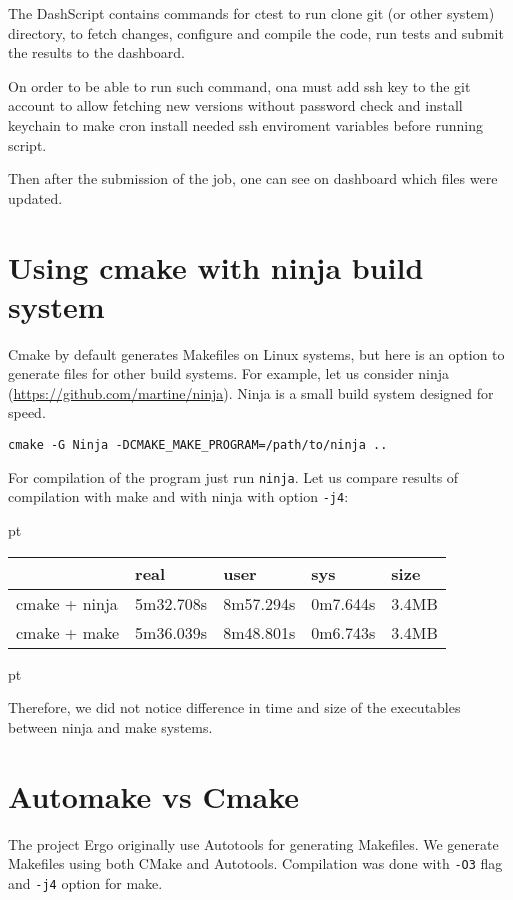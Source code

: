 \documentclass[a4paper,10pt]{article}
\begin{document}
The DashScript contains commands for ctest to run clone git (or other system) directory, to fetch changes, configure and compile the code, run tests and submit the results to the dashboard.

On order to be able to run such command, ona must add ssh key to the git account to allow fetching new versions without password check and install keychain to make cron install needed ssh enviroment variables before running script.


Then after the submission of the job, one can see on dashboard which files were updated.

\section{Using cmake with ninja build system }

Cmake by default generates Makefiles on Linux systems, but here is an option to generate files for other build systems. For example, let us consider ninja (\url{https://github.com/martine/ninja}). Ninja is a small build system designed for speed.

\begin{verbatim}
cmake -G Ninja -DCMAKE_MAKE_PROGRAM=/path/to/ninja ..
\end{verbatim}

For compilation of the program just run \texttt{ninja}.
Let us compare results of compilation with make and with ninja with option \texttt{-j4}:

 pt

\begin{tabular}{|l|l|l|l|l|}
	\hline
	& real & user & sys & size\\
	\hline
	cmake + ninja & 5m32.708s & 8m57.294s & 0m7.644s & 3.4MB\\
	cmake + make  & 5m36.039s & 8m48.801s & 0m6.743s & 3.4MB\\
	\hline
\end{tabular}

 pt

Therefore, we did not notice difference in time and size of the executables between ninja and make systems.



\section{Automake vs Cmake}

The project Ergo originally use Autotools for generating Makefiles. We generate Makefiles using both CMake and Autotools. Compilation was done with \texttt{-O3} flag and \texttt{-j4} option for make.
\end{document}
